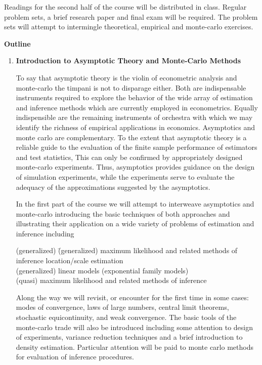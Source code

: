 \vspace{5mm}
\noindent
Readings for the second half of the course will be distributed in class.
Regular problem sets, a brief research paper and final exam will be 
required.  The problem sets will attempt to intermingle theoretical, 
empirical and monte-carlo exercises.

\vspace{10mm}
\begin{center}
{\bf Outline}
\end{center}

\begin{enumerate}
\item {\bf Introduction to Asymptotic Theory and Monte-Carlo Methods}

To say that asymptotic theory is the violin of econometric analysis and 
monte-carlo  the timpani is not to disparage either.  Both are 
indispensable instruments required to explore the behavior of the 
wide array of estimation and inference methods which are currently 
employed in econometrics.  
Equally indispensible are the remaining instruments of orchestra with
which we may identify the richness of empirical applications in economics.
Asymptotics and monte carlo are complementary.  To the 
extent that asymptotic theory is a reliable guide to the evaluation of the 
finite sample performance of estimators and test statistics,  This can 
only be confirmed by appropriately designed monte-carlo experiments.  Thus,
asymptotics provides guidance on the design of simulation experiments, 
while the experiments serve to evaluate the adequacy of the approximations 
suggested by the asymptotics.

In the first part of the course we will attempt to interweave 
asymptotics and monte-carlo introducing the basic techniques of both 
approaches and illustrating their application on a wide variety of problems
of estimation and inference including

\begin{tabbing}
(generalized) \= (generalized) maximum likelihood and related methods of inference \kill
 \> location/scale estimation \\
 \> (generalized) linear models (exponential family models) \\
 \> (quasi) maximum likelihood and related methods of inference
\end{tabbing}

\noindent
Along the way we will revisit, or encounter for the first time in some 
cases:  modes of convergence, laws of large numbers, central 
limit theorems, stochastic equicontinuity, and weak convergence.  The basic
tools of the monte-carlo trade will also be introduced including some attention
to design of experiments, variance reduction techniques and a brief
introduction to density estimation.  Particular attention will be paid to
monte carlo methods for evaluation of inference procedures.  


\end{enumerate}
